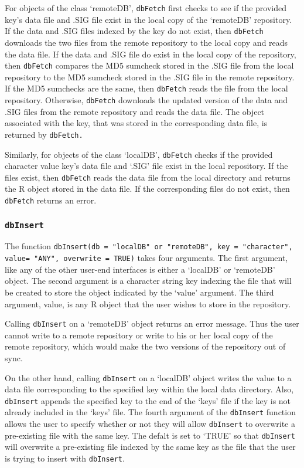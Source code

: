 \documentclass{article}
\newcommand{\code}{\texttt}
\begin{document}
For objects of the class `remoteDB', \code{dbFetch} first checks to 
see if the provided key's data file and .SIG file exist 
in the local copy of the `remoteDB' repository. If the data and .SIG files
indexed by the key do not exist, then \code{dbFetch} downloads the 
two files from the remote repository to the local copy and reads the data file. 
If the data and .SIG file do exist in the local copy of the repository, then
\code{dbFetch} compares the MD5 sumcheck stored in the .SIG file from the local 
repository to the MD5 sumcheck stored in the .SIG file in the remote 
repository. If the MD5 sumchecks are the same, then \code{dbFetch} reads 
the file from the local repository. Otherwise, \code{dbFetch} downloads 
the updated version of the data and .SIG files from the remote repository
and reads the data file. The object associated with the key, that was 
stored in the corresponding data file, is returned by \code{dbFetch.}

Similarly, for objects of the class `localDB', \code{dbFetch}
checks if the provided character value key's data file and `.SIG' file exist 
in the local repository. If the files exist, then \code{dbFetch} reads the
data file from the local directory and returns the R object stored in the
data file. If the corresponding files do not exist, then \code{dbFetch} 
returns an error. 

\subsubsection{\code{dbInsert}}

The function \code{dbInsert(db = "localDB" or
"remoteDB", key = "character", value= "ANY", overwrite = TRUE)} 
takes four arguments. The first argument, like any of the other user-end
interfaces is either a `localDB' or `remoteDB' object.
The second argument is a character string key indexing the file
that will be created to store the object indicated by the `value'
argument. The third argument, value, is any R object that the user 
wishes to store in the repository. 

Calling \code{dbInsert} on a `remoteDB' object returns an
error message. Thus the user cannot write to a remote repository 
or write to his or her local copy of the remote repository, which would
make the two versions of the repository out of sync. 

On the other hand, calling \code{dbInsert} on a `localDB' object 
writes the value to a data file corresponding to the specified key within 
the local data directory. Also, \code{dbInsert} appends the specified key 
to the end of the `keys' file if the key is not already included in the 
`keys' file. The fourth argument of the \code{dbInsert} function allows the
user to specify whether or not they will allow \code{dbInsert} to overwrite
a pre-existing file with the same key. The defalt is set to `TRUE' so that 
\code{dbInsert} will overwrite a pre-existing file indexed by the same
key as the file that the user is trying to insert with \code{dbInsert}.
\end{document}
